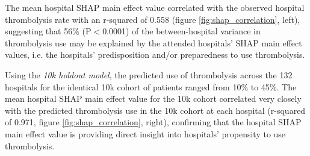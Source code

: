 The mean hospital SHAP main effect value correlated with the observed hospital thrombolysis rate with an r-squared of 0.558 (figure \ref{fig:shap_correlation}, left), suggesting that 56\% (P$<$0.0001) of the between-hospital variance in thrombolysis use may be explained by the attended hospitals' SHAP main effect values, i.e. the hospitals' predisposition and/or preparedness to use thrombolysis.

Using the \emph{10k holdout model}, the predicted use of thrombolysis across the 132 hospitals for the identical 10k cohort of patients ranged from 10\% to 45\%. The mean hospital SHAP main effect value for the 10k cohort correlated very closely with the predicted thrombolysis use in the 10k cohort at each hospital (r-squared of 0.971, figure \ref{fig:shap_correlation}, right), confirming that the hospital SHAP main effect value is providing direct insight into hospitals' propensity to use thrombolysis.

